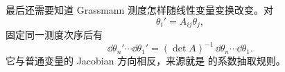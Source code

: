 最后还需要知道 Grassmann 测度怎样随线性变量变换改变。对
\begin{equation}
\theta_i'=A_{ij}\theta_j,
\label{eq:berezin-linear-transform-dp68}
\end{equation}
固定同一测度次序后有
\begin{equation}
\boxed{
\dd\theta_n'\cdots\dd\theta_1'
=(\det A)^{-1}\,
\dd\theta_n\cdots\dd\theta_1.}
\label{eq:berezin-jacobian-dp21}
\end{equation}
它与普通变量的 Jacobian 方向相反，来源就是 的系数抽取规则。
